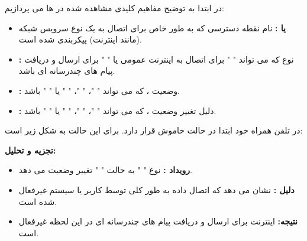 \documentclass{report}
\begin{document}
در ابتدا به توضیح مفاهیم کلیدی مشاهده شده در 
ها می پردازیم:
\begin{itemize}
\item
\textbf{ 
یا
:}
نام نقطه دسترسی که به طور خاص برای اتصال به یک نوع سرویس شبکه (مانند اینترنت) پیکربندی شده است.
\item
\textbf{
:}
 نوع 
 که می تواند "
 " برای اتصال به اینترنت عمومی یا "
 " برای ارسال و دریافت پیام های چندرسانه ای باشد.
\item
\textbf{
:}
 وضعیت
  ، که می تواند "
  "، "
  "، "
  " یا "
  " باشد.
\item
\textbf{
: }
دلیل تغییر وضعیت 
، که می تواند "
"، "
"، "
" یا "
" باشد.

\end{itemize}
در تلفن همراه خود ابتدا 
در حالت خاموش قرار دارد. 
برای این حالت به شکل زیر است:
\begin{latin}
	
	\label{code:state1}
\end{latin}
\textbf{تجزیه و تحلیل:}
\begin{itemize}
	\item
	\textbf{رویداد
	: }
	 نوع "
	 " به حالت "
	 " تغییر وضعیت می دهد.
	\item
	\textbf{دلیل
	:}
	 نشان می دهد که اتصال داده به طور کلی توسط کاربر یا سیستم غیرفعال شده است.
	 \item
	\textbf{نتیجه:}
	 اینترنت برای ارسال و دریافت پیام های چندرسانه ای در این لحظه غیرفعال است.
\end{itemize}
\end{document}
